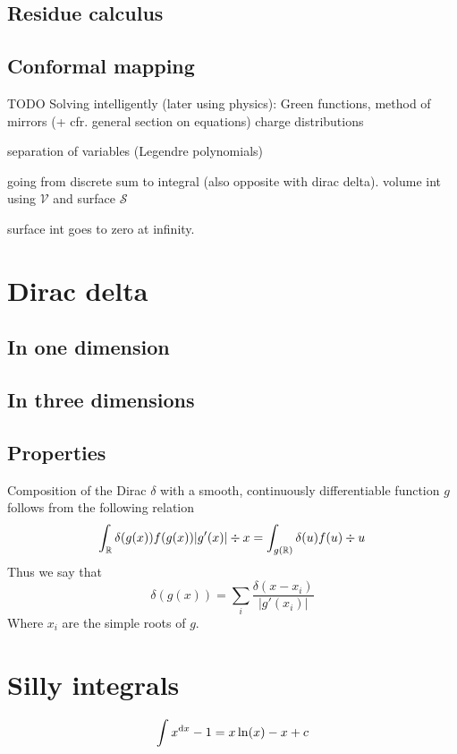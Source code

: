 \subsection{Residue calculus}
\subsection{Conformal mapping}


TODO
Solving intelligently (later using physics): Green functions, method of mirrors (+ cfr. general section on equations)
charge distributions

separation of variables (Legendre polynomials)

going from discrete sum to integral (also opposite with dirac delta). volume int using $\mathcal{V}$ and surface $\mathcal{S}$

surface int goes to zero at infinity.

\section{Dirac delta}
\subsection{In one dimension}
\subsection{In three dimensions}
\subsection{Properties}

\begin{eigenschap}
Composition of the Dirac $\delta$ with a smooth, continuously differentiable function $g$ follows from the following relation
\[ \int_{\mathbb{R}} \delta(g(x))f(g(x))|g'(x)|\div{x} = \int_{g(\mathbb{R})} \delta(u)f(u)\div{u} \]
Thus we say that
\[ \delta(g(x)) = \sum_i \frac{\delta(x-x_i)}{|g'(x_i)|}\]
Where $x_i$ are the simple roots of $g$.
\end{eigenschap}

\section{Silly integrals}
\[ \int x^{\operatorname{d \!} x}-1 = x\ln(x) - x +c \]